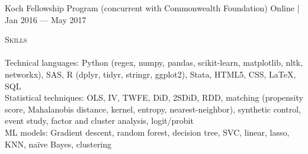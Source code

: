 \documentclass[a4paper,11pt]{article}
\newcommand{\lineunder} {
    \vspace*{-8pt} \\
    \hspace*{-18pt} \hrulefill \\
}
\newcommand{\header} [1] {
    {\hspace*{-18pt}\vspace*{6pt} \textsc{\large{#1}}}
    \vspace*{-6pt} \lineunder
}
\begin{document}
Koch Fellowship Program (concurrent with Commonwealth Foundation) \hfill \faMapMarker\space Online | Jan 2016 --- May 2017

\vspace{1mm}
\header{Skills}
Technical languages: Python (regex, numpy, pandas, scikit-learn, matplotlib, nltk, networkx), SAS, R (dplyr, tidyr, stringr, ggplot2), Stata, HTML5, CSS, \LaTeX, SQL \\

Statistical techniques: OLS, IV, TWFE, DiD, 2SDiD, RDD, matching (propensity score, Mahalanobis distance, kernel, entropy, nearest-neighbor), synthetic control, event study, factor and cluster analysis, logit/probit \\

ML models: Gradient descent, random forest, decision tree, SVC, linear, lasso, KNN, na\"{i}ve Bayes, clustering
\end{document}
